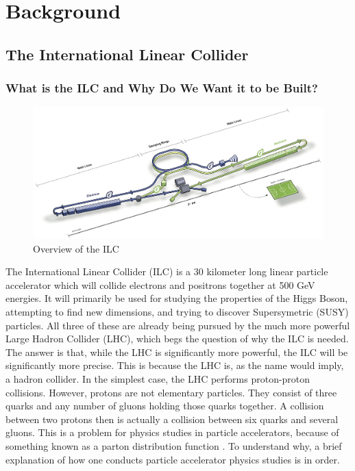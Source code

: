 \documentclass{report}
\begin{document}
    \chapter{ Background }
         \setcounter{page}{1}
        \section{ The International Linear Collider }
            \subsection{ What is the ILC and Why Do We Want it to be Built? }
                \begin{figure}[h] 
                    \includegraphics[width=\textwidth]{ilcoverview}
                    \centering
                    \caption{Overview of the ILC}
                    \label{fig__ilcoverview}
                \end{figure}

                The International Linear Collider (ILC) is a 30 kilometer long linear particle accelerator \cite{specs} which will collide electrons and positrons together at 500 GeV energies. It will primarily be used for studying the properties of the Higgs Boson, attempting to find new dimensions, and trying to discover Supersymetric (SUSY) particles. All three of these are already being pursued by the much more powerful Large Hadron Collider (LHC), which begs the question of why the ILC is needed. The answer is that, while the LHC is significantly more powerful, the ILC will be significantly more precise. This is because the LHC is, as the name would imply, a hadron collider. In the simplest case, the LHC performs proton-proton collisions. However, protons are not elementary particles. They consist of three quarks and any number of gluons holding those quarks together. A collision between two protons then is actually a collision between six quarks and several gluons. This is a problem for physics studies in particle accelerators, because of something known as a parton distribution function \cite{parton}. To understand why, a brief explanation of how one conducts particle accelerator physics studies is in order.
\end{document}
